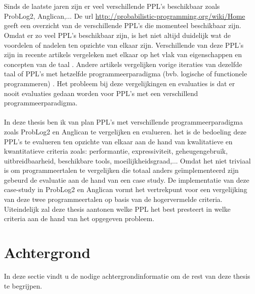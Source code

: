 \documentclass[12pt,a4paper,oneside]{book}
\theoremstyle{definition}
\begin{document}
\\\\
Sinds de laatste jaren zijn er veel verschillende PPL's beschikbaar zoals ProbLog2, Anglican,... De url \url{http://probabilistic-programming.org/wiki/Home} geeft een overzicht van de verschillende PPL's die momenteel beschikbaar zijn.
Omdat er zo veel PPL's beschikbaar zijn, is het niet altijd duidelijk wat de voordelen of nadelen ten opzichte van elkaar zijn. Verschillende van deze PPL's zijn in recente artikels vergeleken met elkaar op het vlak van eigenschappen en concepten van de taal \cite{plpconcepts}. Andere artikels vergelijken vorige iteraties van dezelfde taal of PPL's met hetzelfde programmeerparadigma (bvb. logische of functionele programmeren) \cite{plpinferencelearningwbf}. Het probleem bij deze vergelijkingen en evaluaties is dat er nooit evaluaties gedaan worden voor PPL's met een verschillend programmeerparadigma.
\\\\
In deze thesis ben ik van plan PPL's met verschillende programmeerparadigma zoals ProbLog2 en Anglican te vergelijken en evalueren. het is de bedoeling deze PPL's te evalueren ten opzichte van elkaar aan de hand van kwalitatieve en kwantitatieve criteria zoals: performantie, expressiviteit, geheugengebruik, uitbreidbaarheid, beschikbare tools, moeilijkheidsgraad,... Omdat het niet triviaal is om programmeertalen te vergelijken die totaal anders ge\"{i}mplementeerd zijn gebeurd de evaluatie aan de hand van een case study. De implementatie van deze case-study in ProbLog2 en Anglican vormt het vertrekpunt voor een vergelijking van deze twee programmeertalen op basis van de hogervermelde criteria. Uiteindelijk zal deze thesis aantonen welke PPL het best presteert in welke criteria aan de hand van het opgegeven probleem.

\chapter{Achtergrond}
In deze sectie vindt u de nodige achtergrondinformatie om de rest van deze thesis te begrijpen.
\end{document}
